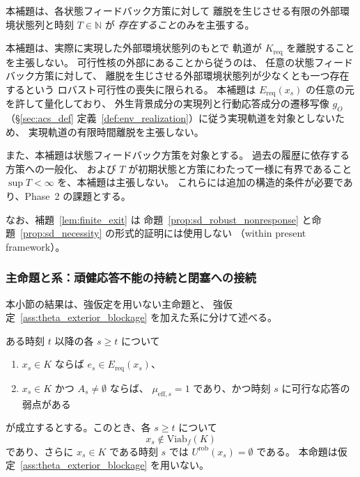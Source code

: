 \begin{remark}
\label{rem:uniform_bound}
本補題は、各状態フィードバック方策に対して
離脱を生じさせる有限の外部環境状態列と時刻 $T\in\mathbb{N}$ が
\emph{存在すること}のみを主張する。

本補題は、実際に実現した外部環境状態列のもとで
軌道が $K_{\mathrm{req}}$ を離脱することを主張しない。
可行性核の外部にあることから従うのは、
任意の状態フィードバック方策に対して、
離脱を生じさせる外部環境状態列が少なくとも一つ存在するという
ロバスト可行性の喪失に限られる。
本補題は $E_{\mathrm{req}}(x_s)$ の任意の元を許して量化しており、
外生背景成分の実現列と行動応答成分の遷移写像 $g_O$
（\S\ref{sec:acs_def} 定義~\ref{def:env_realization}）に従う実現軌道を対象としないため、
実現軌道の有限時間離脱を主張しない。

また、本補題は状態フィードバック方策を対象とする。
過去の履歴に依存する方策への一般化、
および $T$ が初期状態と方策にわたって一様に有界であること
$\sup T<\infty$
を、本補題は主張しない。
これらには追加の構造的条件が必要であり、Phase~2 の課題とする。

なお、補題~\ref{lem:finite_exit} は
命題~\ref{prop:sd_robust_nonresponse} と命題~\ref{prop:sd_necessity} の形式的証明には使用しない
（within present framework）。
\end{remark}

\subsubsection{主命題と系：頑健応答不能の持続と閉塞への接続}
\label{subsubsec:sd_main}

本小節の結果は、強仮定を用いない主命題と、
強仮定~\ref{ass:theta_exterior_blockage} を加えた系に分けて述べる。

\begin{proposition}
\label{prop:sd_robust_nonresponse}
ある時刻 $t$ 以降の各 $s\ge t$ について
\begin{enumerate}[label=(\alph*)]
  \item $x_s\in K$ ならば $e_s\in E_{\mathrm{req}}(x_s)$、
  \item $x_s\in K$ かつ $A_s\neq\emptyset$ ならば、
  $\mu_{\mathrm{eff},s}=1$ であり、かつ時刻 $s$ に可行な応答の弱点がある
\end{enumerate}
が成立するとする。このとき、各 $s\ge t$ について
\[
  x_s\notin\mathrm{Viab}_f(K)
\]
であり、さらに $x_s\in K$ である時刻 $s$ では $U^{\mathrm{rob}}(x_s)=\emptyset$ である。
本命題は仮定~\ref{ass:theta_exterior_blockage} を用いない。
\end{proposition}

